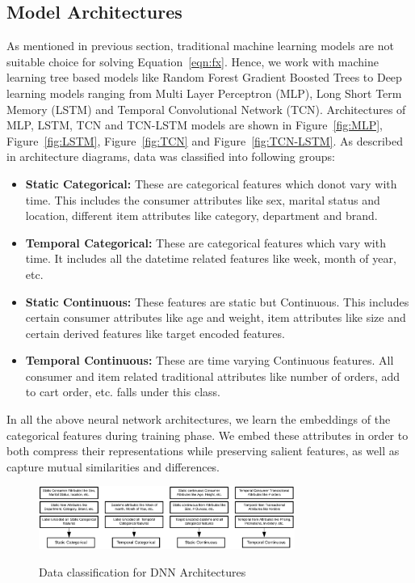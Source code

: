 \subsection{Model Architectures}
As mentioned in previous section, traditional machine learning models are not suitable choice for solving Equation~\ref{eqn:fx}. 
Hence, we work with machine learning tree based models like Random Forest Gradient Boosted Trees 
to Deep learning models ranging from Multi Layer Perceptron (MLP), Long Short 
Term Memory (LSTM) and Temporal Convolutional Network (TCN). Architectures of MLP, LSTM, TCN and TCN-LSTM 
models are shown in Figure~\ref{fig:MLP}, Figure~\ref{fig:LSTM}, Figure~\ref{fig:TCN}
and Figure~\ref{fig:TCN-LSTM}. As described in architecture diagrams, data was classified into following groups:
\begin{itemize}
\item {\bf Static Categorical:} These are categorical features which donot vary with time. This includes the consumer
attributes like sex, marital status and location, different item attributes like category, department and brand.
\item {\bf Temporal Categorical:} These are categorical features which vary with time. It includes all the datetime 
related features like week, month of year, etc.
\item {\bf Static Continuous:} These features are static but Continuous. This includes certain consumer attributes like
age and weight, item attributes like size and certain derived features like target encoded features.
\item {\bf Temporal Continuous:} These are time varying Continuous features. All consumer and item related
traditional attributes like number of orders, add to cart order, etc. falls under this class.
\end{itemize}
In all the above neural network architectures, we learn the embeddings of the categorical features during training phase.
We embed these attributes in order to both compress their representations while preserving
salient features, as well as capture mutual similarities and differences.
  \begin{figure}[t]
    \centering 
    \caption{Data classification for DNN Architectures} 
    \includegraphics[width=3.3in]{img/dnndata.png} 
    \label{fig:dnndata} 
  \end{figure}
